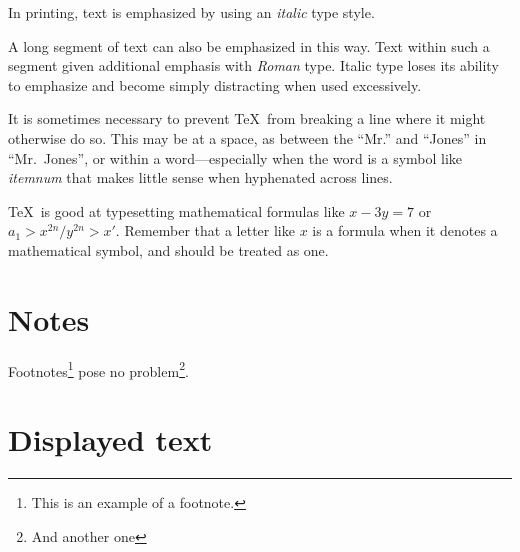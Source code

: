\documentclass[joc]{ipart}
\theoremstyle{plain}
\begin{document}
In printing, text is emphasized by using an
       {\em italic\/}  %
type style.

\begin{em}
   A long segment of text can also be emphasized in this way.  Text within
   such a segment given additional emphasis
      with\/ {\em Roman}
   type.  Italic type loses its ability to emphasize and become simply
   distracting when used excessively.
\end{em}

It is sometimes necessary to prevent \TeX\ from breaking a line where
it might otherwise do so.  This may be at a space, as between the
``Mr.'' and ``Jones'' in
       ``Mr.~Jones'',        %
or within a word---especially when the word is a symbol like
       \mbox{\em itemnum\/}
that makes little sense when hyphenated across
       lines.

\TeX\ is good at typesetting mathematical formulas like
       \( x-3y = 7 \)
or
       \( a_{1} > x^{2n} / y^{2n} > x' \).
Remember that a letter like
       $x$        %
is a formula when it denotes a mathematical symbol, and should
be treated as one.


\section{Notes}
Footnotes\footnote{This is an example of a footnote.}
pose no problem\footnote{And another one}.

\section{Displayed text}
\end{document}
